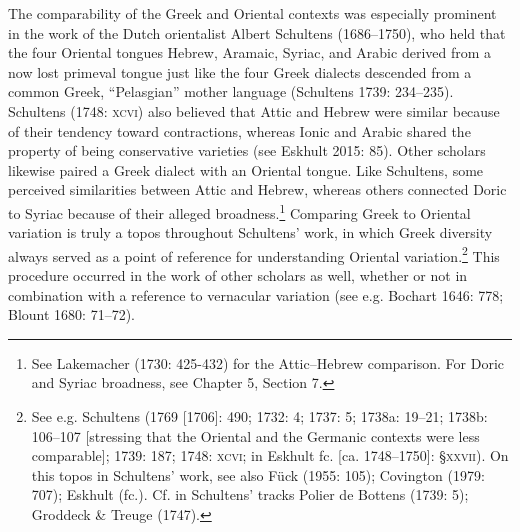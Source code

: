 \documentclass[12pt]{article}
\newenvironment{styleStandard}{\renewcommand\baselinestretch{1.25}\setlength\leftskip{0in}\setlength\rightskip{0in}\setlength\parindent{0.1972in}\setlength\parfillskip{0pt plus 1fil}\setlength\parskip{0in plus 1pt}\writerlistparindent\writerlistleftskip\leavevmode\normalfont\normalsize\writerlistlabel\ignorespaces}{\unskip\vspace{0in plus 1pt}\par}
\newcommand\writerlistleftskip{}
\newcommand\writerlistparindent{}
\newcommand\writerlistlabel{}
\begin{document}
\begin{styleStandard}
The comparability of the Greek and Oriental contexts was especially prominent in the work of the Dutch orientalist Albert Schultens (1686–1750), who held that the four Oriental tongues Hebrew, Aramaic, Syriac, and Arabic derived from a now lost primeval tongue just like the four Greek dialects descended from a common Greek, “Pelasgian” mother language (Schultens 1739: 234–235). Schultens (1748: \textsc{xcvi)} also believed that Attic and Hebrew were similar because of their tendency toward contractions, whereas Ionic and Arabic shared the property of being conservative varieties (see Eskhult 2015: 85). Other scholars likewise paired a Greek dialect with an Oriental tongue. Like Schultens, some perceived similarities between Attic and Hebrew, whereas others connected Doric to Syriac because of their alleged broadness.\footnote{ See Lakemacher (1730: 425-432) for the Attic–Hebrew comparison. For Doric and Syriac broadness, see Chapter 5, Section 7.} Comparing Greek to Oriental variation is truly a topos throughout Schultens’ work, in which Greek diversity always served as a point of reference for understanding Oriental variation.\footnote{ See e.g. Schultens (1769 [1706]: 490; 1732: 4; 1737: 5; 1738a: 19–21; 1738b: 106–107 [stressing that the Oriental and the Germanic contexts were less comparable]; 1739: 187; 1748: \textsc{xcvi}; in Eskhult fc. [ca. 1748–1750]: §\textsc{xxvii}). On this topos in Schultens’ work, see also Fück (1955: 105); Covington (1979: 707); Eskhult (fc.). Cf. in Schultens’ tracks Polier de Bottens (1739: 5); Groddeck \& Treuge (1747).} This procedure occurred in the work of other scholars as well, whether or not in combination with a reference to vernacular variation (see e.g. Bochart 1646: 778; Blount 1680: 71–72).
\end{styleStandard}
\end{document}
